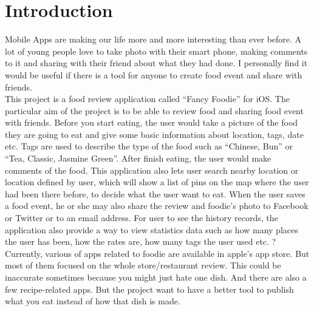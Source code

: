 \chapter{Introduction}

Mobile Apps are making our life more and more interesting than ever before. A lot of young people love to take photo with their smart phone, making comments to it and sharing with their friend about what they had done. I personally find it would be useful if there is a tool for anyone to create food event and share with friends. \\


This project is a food review application called ``Fancy Foodie'' for iOS. The particular aim of the project is to be able to review food and sharing food event with friends. Before you start eating, the user would take a picture of the food they are going to eat and give some basic information about location, tags, date etc. Tags are used to describe the type of the food such as ``Chinese, Bun'' or ``Tea, Classic, Jasmine Green''. After finish eating, the user would make comments of the food. This application also lets user search nearby location or location defined by user, which will show a list of pins on the map where the user had been there before, to decide what the user want to eat. When the user saves a food event, he or she may also share the review and foodie's photo to Facebook or Twitter or to an email address. For user to see the history records, the application also provide a way to view statistics data such as how many places the user has been, how the rates are, how many tags the user used etc. ?\\


Currently, various of apps related to foodie are available in apple's app store. But most of them focused on the whole store/restaurant review. This could be inaccurate sometimes because you might just hate one dish. And there are also a few recipe-related apps. But the project want to have a better tool to publish what you eat instead of how that dish is made. \\ 

